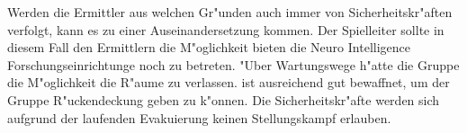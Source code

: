\begin{remarks}
    Werden die Ermittler aus welchen Gr"unden auch immer von Sicherheitskr"aften verfolgt, kann es zu einer Auseinandersetzung kommen. Der Spielleiter sollte in diesem Fall den Ermittlern die M"oglichkeit bieten die Neuro Intelligence Forschungseinrichtunge noch zu betreten. "Uber Wartungswege h"atte die Gruppe die M"oglichkeit die R"aume zu verlassen. \xl{} ist ausreichend gut bewaffnet, um der Gruppe R"uckendeckung geben zu k"onnen. Die Sicherheitskr"afte werden sich aufgrund der laufenden Evakuierung keinen Stellungskampf erlauben.
\end{remarks}
